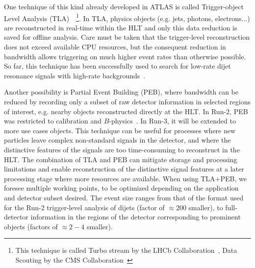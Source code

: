 One technique of this kind already developed in ATLAS is called Trigger-object Level Analysis (TLA)~\cite{EXOT-2016-20}~\footnote{This technique is called Turbo stream by the LHCb Collaboration~\cite{Aaij:2016rxn}, Data Scouting by the CMS Collaboration~\cite{Khachatryan:2016ecr}}. In TLA, physics objects (e.g. jets, photons, electrons...) are reconstructed in real-time within the HLT and only this data reduction is saved for offline analysis. 
Care must be taken that the trigger-level reconstruction does not exceed available CPU resources, but the consequent reduction in bandwidth allows triggering on much higher event rates than otherwise possible. So far, this technique has been successfully used to search for low-rate dijet resonance signals with high-rate backgrounds~\cite{TLAPRL}.

Another possibility is Partial Event Building (PEB), where bandwidth can be reduced by recording only a subset of raw detector information in selected regions of interest, e.g. nearby objects reconstructed directly at the HLT.
In Run-2, PEB was restricted to calibration and $B$-physics~\cite{TRIG-2016-01}. In Run-3, it will be extended to more use cases objects. 
This technique can be useful for processes where new particles leave complex non-standard signals in the detector, and where the distinctive features of the signals are too time-consuming to reconstruct in the HLT. The combination of TLA and PEB can mitigate storage and processing limitations and enable reconstruction of the distinctive signal features at a later processing stage where more resources are available. 
When using TLA+PEB, we foresee multiple working points, to be optimized depending on the application and detector subset desired. The event size ranges from that of the format used for the Run-2 trigger-level analysis of dijets (factor of $\approx200$ smaller), to full-detector information in the regions of the detector corresponding to prominent objects (factors of $\approx 2-4$ smaller). %


